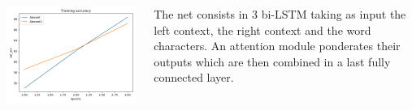 \documentclass[25pt, a0paper,
               colspace=15mm, subcolspace=0mm,
               blockverticalspace=17mm,
               landscape]{tikzposter} %
\begin{document}
\begin{columns}
{\vspace{-15pt}
\begin{center}
	\includegraphics{figures/prune_ratio}
\end{center}

The net consists in 3 bi-LSTM taking as input the left context, the right context and the word characters. An attention module ponderates their outputs which are then combined in a last fully connected layer.

}
\end{columns}
\end{document}
